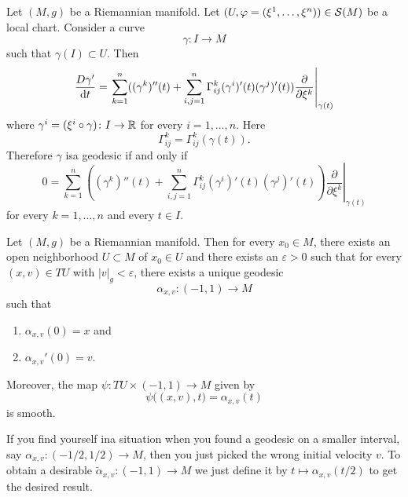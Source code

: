 \begin{remark}
Let $(M,g)$ be a Riemannian manifold. Let
$(U,\varphi=(\xi^{1},\dots,\xi^{n}))\in\mathcal{S}(M)$ be a local
chart. Consider a curve
\begin{equation}
\gamma\colon I\to M
\end{equation}
such that $\gamma(I)\subset U$. Then
\begin{equation}
\frac{D\gamma'}{\mathrm{d} t}=\left.\sum^{n}_{k=1}((\gamma^{k})''(t)+\sum^{n}_{i,j=1}\Gamma^{k}_{ij}(\gamma^{i})'(t)(\gamma^{j})'(t))\frac{\partial}{\partial\xi^{k}}\right|_{\gamma(t)}
\end{equation}
where $\gamma^{i}=(\xi^{i}\circ\gamma)\colon I\to\mathbb{R}$ for every $i=1,\dots,n$.
Here
\begin{equation}
\Gamma^{k}_{ij}=\Gamma^{k}_{ij}(\gamma(t)).
\end{equation}
Therefore $\gamma$ isa geodesic if and only if
\begin{equation}
0=\left.\sum^{n}_{k=1}((\gamma^{k})''(t)+\sum^{n}_{i,j=1}\Gamma^{k}_{ij}(\gamma^{i})'(t)(\gamma^{j})'(t))\frac{\partial}{\partial\xi^{k}}\right|_{\gamma(t)}
\end{equation}
for every $k=1,\dots,n$ and every $t\in I$.
\end{remark}

\begin{theorem}
Let $(M,g)$ be a Riemannian manifold. Then for every $x_{0}\in M$,
there exists an open neighborhood $U\subset M$ of $x_{0}\in U$ and
there exists an $\varepsilon>0$ such that for every $(x,v)\in TU$ with
$|v|_{g}<\varepsilon$, there exists a unique geodesic
\begin{equation}
\alpha_{x,v}\colon(-1,1)\to M
\end{equation}
such that
\begin{enumerate}
\item $\alpha_{x,v}(0)=x$ and
\item $\alpha_{x,v}'(0)=v$.
\end{enumerate}
Moreover, the map $\psi\colon TU\times(-1,1)\to M$ given by
\begin{equation}
\psi\bigl((x,v),t\bigr)=\alpha_{x,v}(t)
\end{equation}
is smooth.
\end{theorem}

\begin{remark}
If you find yourself ina situation when you found a geodesic on a
smaller interval, say $\alpha_{x,v}\colon(-1/2,1/2)\to M$, then you
just picked the wrong initial velocity $v$. To obtain a desirable
$\widetilde{\alpha}_{x,v}\colon(-1,1)\to M$ we just define it by
$t\mapsto\alpha_{x,v}(t/2)$ to get the desired result.
\end{remark}


